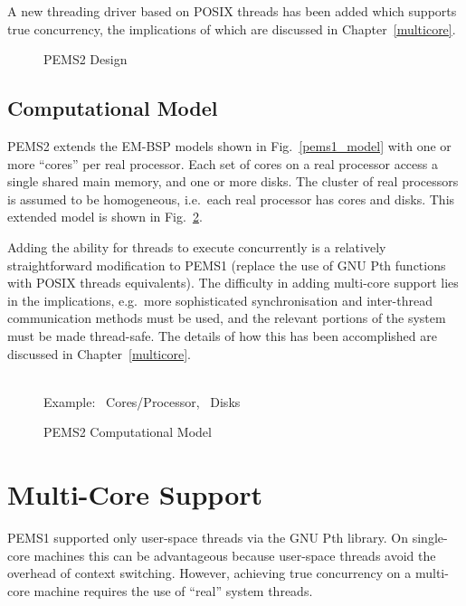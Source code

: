 \documentclass[12pt]{carletoncsthesis}
\begin{document}
A new threading driver based on POSIX threads has been added which
supports true concurrency, the implications of which are discussed in
Chapter~\ref{multicore}.

\begin{figure}[ht]
\begin{center}
\caption{PEMS2 Design}
\label{pems2_design}
\end{center}
\end{figure}


\clearpage
\section{Computational Model}


PEMS2 extends the EM-BSP \cite{dhthesis}\cite{bspem}\cite{emsimulation}
models shown in Fig.~\ref{pems1_model} with one or more ``cores'' per real
processor.  Each set of cores on a real processor access a single shared main
memory, and one or more disks.  The cluster of real processors is assumed
to be homogeneous, i.e.\ each real processor has  cores and  disks.
This extended model is shown in Fig.~\ref{pems2_model}.

Adding the ability for threads to execute concurrently is a relatively
straightforward modification to PEMS1 (replace the use of GNU Pth functions
with POSIX threads equivalents).  The difficulty in adding multi-core
support lies in the implications, e.g.\ more sophisticated synchronisation and
inter-thread communication methods must be used, and the relevant portions
of the system must be made thread-safe.  The details of how this has been
accomplished are discussed in Chapter~\ref{multicore}.

\begin{figure}[ht]
\begin{center}
	 \\
Example: ~Cores/Processor,
~Disks
\end{center}
\caption{PEMS2 Computational Model}
\label{pems2_model}
\end{figure}




\chapter{Multi-Core Support}
\thispagestyle{empty}
\label{multicore}


PEMS1 supported only user-space threads via the GNU Pth library.  On single-core
machines this can be advantageous because user-space threads avoid the
overhead of context switching.  However, achieving true concurrency on a
multi-core machine requires the use of ``real'' system threads.
\end{document}

